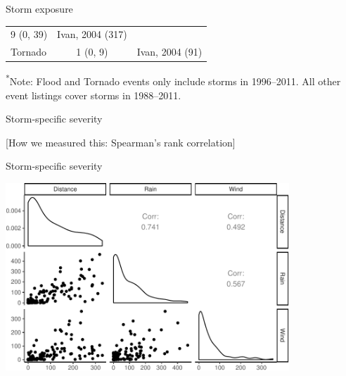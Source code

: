 \documentclass[ignorenonframetext,]{beamer}
\begin{document}
\begin{frame}{Storm exposure}
\begin{longtable}[]{@{}lcc@{}}
\begin{minipage}[t]{0.34\columnwidth}
9 (0, 39)\strut
\end{minipage} & \begin{minipage}[t]{0.34\columnwidth}\centering\strut
Ivan, 2004 (317)\strut
\end{minipage}\tabularnewline
\begin{minipage}[t]{0.23\columnwidth}\raggedright\strut
Tornado\strut
\end{minipage} & \begin{minipage}[t]{0.34\columnwidth}\centering\strut
1 (0, 9)\strut
\end{minipage} & \begin{minipage}[t]{0.34\columnwidth}\centering\strut
Ivan, 2004 (91)\strut
\end{minipage}\tabularnewline
\bottomrule
\end{longtable}

\footnotesize{\textsuperscript{*}Note: Flood and Tornado events only include storms in 1996--2011. All other event listings cover storms in 1988--2011.}

\end{frame}

\begin{frame}{Storm-specific severity}

{[}How we measured this: Spearman's rank correlation{]}

\end{frame}

\begin{frame}{Storm-specific severity}

\begin{center}\includegraphics[width=0.8\textwidth]{anderson_jan11_files/figure-beamer/unnamed-chunk-5-1} \end{center}

\end{frame}
\end{document}
